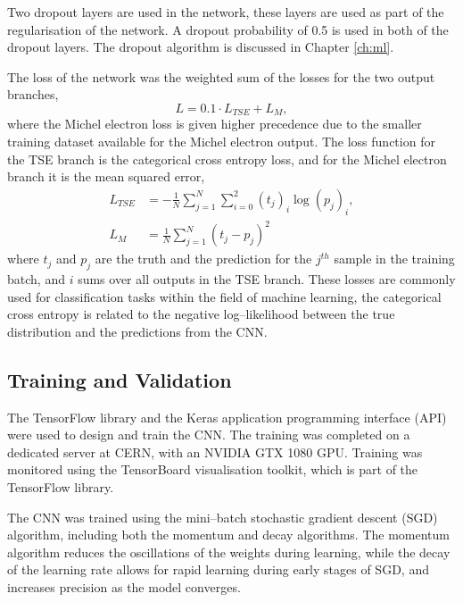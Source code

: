Two dropout layers are used in the network, these layers are used as part of the
regularisation of the network. A dropout probability of 0.5 is used in both of
the dropout layers. The dropout algorithm is discussed in Chapter \ref{ch:ml}.

The loss of the network was the weighted sum of the losses for the two output
branches,
\begin{equation*}
	L = 0.1 \cdot L_{TSE} + L_M,
\end{equation*}
where the Michel electron loss is given higher precedence due to the smaller
training dataset available for the Michel electron output. The loss function for
the TSE branch is the categorical cross entropy 
loss\cite{750fabedbacb467c8fafd98b87f77436}, and for the Michel electron branch
it is the mean squared error\cite{mse_springer},
\begin{align*}
	L_{TSE} &= - \frac{1}{N} \sum_{j=1}^N \sum_{i=0}^2 (t_j)_i \log (p_j)_i, \\
	L_M &= \frac{1}{N} \sum_{j=1}^N (t_j - p_j)^2
\end{align*}
where $t_j$ and $p_j$ are the truth and the prediction for the $j^{th}$ sample 
in the training batch, and $i$ sums over all outputs in the TSE branch. These
losses are commonly used for classification tasks within the field of machine 
learning, the categorical cross entropy is related to the negative
log--likelihood between the true distribution and the predictions from the 
CNN\cite{GoodfellowIan2016Dl}. 

\subsection{Training and Validation}
The TensorFlow\cite{45381} library and the Keras\cite{chollet2015keras} 
application programming interface (API) were used to design and train the CNN. 
The training was completed on a dedicated \protodune{} server at CERN, with an 
NVIDIA GTX 1080 GPU. Training was monitored using the TensorBoard visualisation 
toolkit\cite{tensorboard}, which is part of the TensorFlow library. 

The CNN was trained using the mini--batch stochastic gradient descent (SGD)
algorithm, including both the momentum and decay algorithms\cite{Reed1999}. 
The momentum algorithm reduces the oscillations of the weights during 
learning, while the decay of the learning rate allows for rapid learning 
during early stages of SGD, and increases precision as the model converges. 

